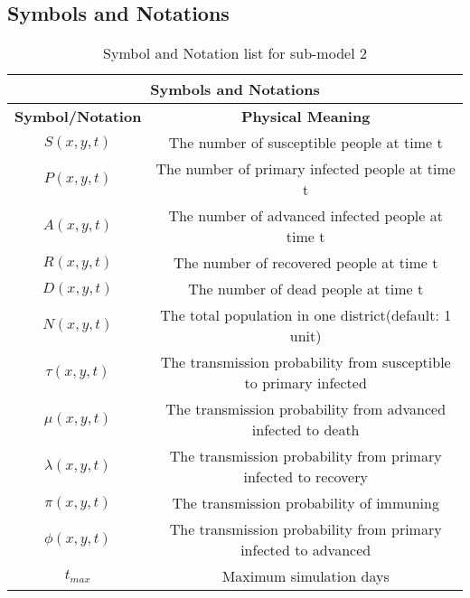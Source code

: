 \subsection{Symbols and Notations}
\begin{table}[htbp]
\caption{Symbol and Notation list for sub-model 2}
\center
\begin{tabular}{|cc|ccccc|}
\hline
                                      \multicolumn{ 7}{|c|}{{\bf Symbols and Notations}} \\
\hline
\multicolumn{ 2}{|c|}{{\bf Symbol/Notation}} &                  \multicolumn{ 5}{|c|}{{\bf Physical Meaning}} \\
\hline
\multicolumn{ 2}{|c|}{$S(x,y,t)$} & \multicolumn{ 5}{|c|}{The number of susceptible people at time t} \\
\hline
\multicolumn{ 2}{|c|}{$P(x,y,t)$} & \multicolumn{ 5}{|c|}{The number of primary infected people at time t} \\
\hline
\multicolumn{ 2}{|c|}{$A(x,y,t)$} & \multicolumn{ 5}{|c|}{The number of advanced infected people at time t} \\
\hline
\multicolumn{ 2}{|c|}{$R(x,y,t)$} & \multicolumn{ 5}{|c|}{The number of recovered people at time t} \\
\hline
\multicolumn{ 2}{|c}{$D(x,y,t)$} &      \multicolumn{ 5}{|c|}{The number of dead people at time t} \\
\hline
\multicolumn{ 2}{|c|}{$N(x,y,t)$} & \multicolumn{ 5}{|c|}{The total population in one district(default: 1 unit)} \\
\hline
\multicolumn{ 2}{|c|}{$\tau(x,y,t)$} & \multicolumn{ 5}{|c|}{The transmission probability from susceptible to primary infected} \\
\hline
\multicolumn{ 2}{|c|}{$\mu(x,y,t)$} & \multicolumn{ 5}{|c|}{The transmission probability from advanced infected to death} \\
\hline
\multicolumn{ 2}{|c|}{$\lambda(x,y,t)$} & \multicolumn{ 5}{|c|}{The transmission probability from primary infected to recovery} \\
\hline
\multicolumn{ 2}{|c|}{$\pi(x,y,t)$} & \multicolumn{ 5}{|c|}{The transmission probability of immuning} \\
\hline
\multicolumn{ 2}{|c|}{$\phi(x,y,t)$} & \multicolumn{ 5}{|c|}{The transmission probability from primary infected to advanced} \\
\hline
\multicolumn{ 2}{|c|}{$t_{max}$} &                 \multicolumn{ 5}{|c|}{Maximum simulation days} \\
\hline
\end{tabular}  
\end{table}
